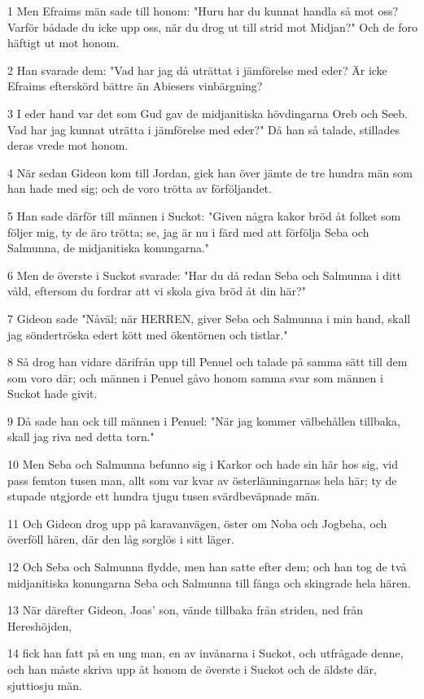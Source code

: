 \par 1 Men Efraims män sade till honom: "Huru har du kunnat handla så mot oss? Varför bådade du icke upp oss, när du drog ut till strid mot Midjan?" Och de foro häftigt ut mot honom.
\par 2 Han svarade dem: "Vad har jag då uträttat i jämförelse med eder? Är icke Efraims efterskörd bättre än Abiesers vinbärgning?
\par 3 I eder hand var det som Gud gav de midjanitiska hövdingarna Oreb och Seeb. Vad har jag kunnat uträtta i jämförelse med eder?" Då han så talade, stillades deras vrede mot honom.
\par 4 När sedan Gideon kom till Jordan, gick han över jämte de tre hundra män som han hade med sig; och de voro trötta av förföljandet.
\par 5 Han sade därför till männen i Suckot: "Given några kakor bröd åt folket som följer mig, ty de äro trötta; se, jag är nu i färd med att förfölja Seba och Salmunna, de midjanitiska konungarna."
\par 6 Men de överste i Suckot svarade: "Har du då redan Seba och Salmunna i ditt våld, eftersom du fordrar att vi skola giva bröd åt din här?"
\par 7 Gideon sade "Nåväl; när HERREN, giver Seba och Salmunna i min hand, skall jag söndertröska edert kött med ökentörnen och tistlar."
\par 8 Så drog han vidare därifrån upp till Penuel och talade på samma sätt till dem som voro där; och männen i Penuel gåvo honom samma svar som männen i Suckot hade givit.
\par 9 Då sade han ock till männen i Penuel: "När jag kommer välbehållen tillbaka, skall jag riva ned detta torn."
\par 10 Men Seba och Salmunna befunno sig i Karkor och hade sin här hos sig, vid pass femton tusen man, allt som var kvar av österlänningarnas hela här; ty de stupade utgjorde ett hundra tjugu tusen svärdbeväpnade män.
\par 11 Och Gideon drog upp på karavanvägen, öster om Noba och Jogbeha, och överföll hären, där den låg sorglös i sitt läger.
\par 12 Och Seba och Salmunna flydde, men han satte efter dem; och han tog de två midjanitiska konungarna Seba och Salmunna till fånga och skingrade hela hären.
\par 13 När därefter Gideon, Joas' son, vände tillbaka från striden, ned från Hereshöjden,
\par 14 fick han fatt på en ung man, en av invånarna i Suckot, och utfrågade denne, och han måste skriva upp åt honom de överste i Suckot och de äldste där, sjuttiosju män.
